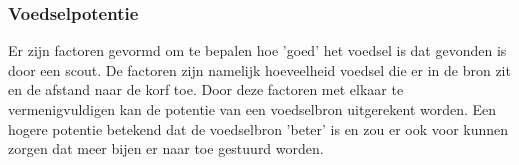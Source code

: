 \subsubsection{Voedselpotentie}
Er zijn factoren gevormd om te bepalen hoe 'goed' het voedsel is dat gevonden is door een scout. De factoren zijn namelijk hoeveelheid voedsel die er in de bron zit 
en de afstand naar de korf toe. Door deze factoren met elkaar te vermenigvuldigen kan de potentie van een voedselbron uitgerekent worden. 
Een hogere potentie betekend dat de voedselbron 'beter' is en zou er ook voor kunnen zorgen dat meer bijen er naar toe gestuurd worden. 

\newpage